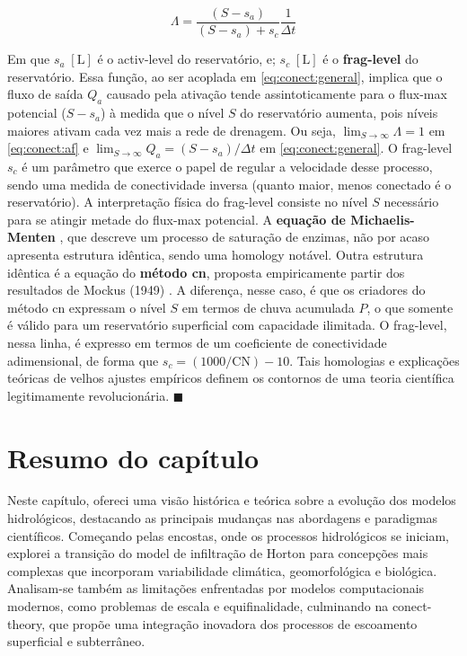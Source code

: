 \documentclass[./main.tex]{subfiles}
\begin{document}
\begin{linenomath*}
\begin{equation} 
	\label{eq:conect:af}
	\Lambda = \frac{(S - s_a)}{(S - s_a) + s_c} \frac{1}{\Delta t}
\end{equation}
\end{linenomath*}
Em que $s_{a}\;[\text{L}]$ é o \gls{activ-level} do reservatório, e;  $s_{c}\;[\text{L}]$ é o \textbf{\gls{frag-level}} do reservatório. Essa função, ao ser acoplada em \eqref{eq:conect:general}, implica que o fluxo de saída $Q_a$ causado pela ativação tende assintoticamente para o \gls{flux-max} potencial ($S - s_a$) à medida que o nível $S$ do reservatório aumenta, pois níveis maiores ativam cada vez mais a rede de drenagem. Ou seja, $\lim _{S \to \infty} \Lambda= 1$ em \eqref{eq:conect:af} e $\lim _{S \to \infty} Q_a = (S - s_a)/ \Delta t$ em \eqref{eq:conect:general}. O \gls{frag-level} $s_c$ é um parâmetro que exerce o papel de regular a velocidade desse processo, sendo uma medida de conectividade inversa (quanto maior, menos conectado é o reservatório). A interpretação física do \gls{frag-level} consiste no nível $S$ necessário para se atingir metade do \gls{flux-max} potencial. A \textbf{equação de Michaelis-Menten} \cite{Johnson2011a}, que descreve um processo de saturação de enzimas, não por acaso apresenta estrutura idêntica, sendo uma \gls{homology} notável. Outra estrutura idêntica é a equação do \textbf{método \acrshort{cn}}, proposta empiricamente partir dos resultados de Mockus (1949) \cite{mockus1949}. A diferença, nesse caso, é que os criadores do método \acrshort{cn} expressam o nível $S$ em termos de chuva acumulada $P$, o que somente é válido para um reservatório superficial com capacidade ilimitada. O \gls{frag-level}, nessa linha, é expresso em termos de um coeficiente de conectividade adimensional, de forma que $s_c = (1000/\text{CN}) - 10$. Tais homologias e explicações teóricas de velhos ajustes empíricos definem os contornos de uma \gls{teoria} científica legitimamente revolucionária. $\blacksquare$

\clearpage

\section{Resumo do capítulo} \label{sec:hydro:summary}

\par Neste capítulo, ofereci uma visão histórica e teórica sobre a evolução dos modelos hidrológicos, destacando as principais mudanças nas abordagens e paradigmas científicos. Começando pelas encostas, onde os processos hidrológicos se iniciam, explorei a transição do \gls{model} de infiltração de Horton para concepções mais complexas que incorporam variabilidade climática, geomorfológica e biológica. Analisam-se também as limitações enfrentadas por modelos computacionais modernos, como problemas de escala e equifinalidade, culminando na \gls{conect-theory}, que propõe uma integração inovadora dos processos de escoamento superficial e subterrâneo.
\end{document}
